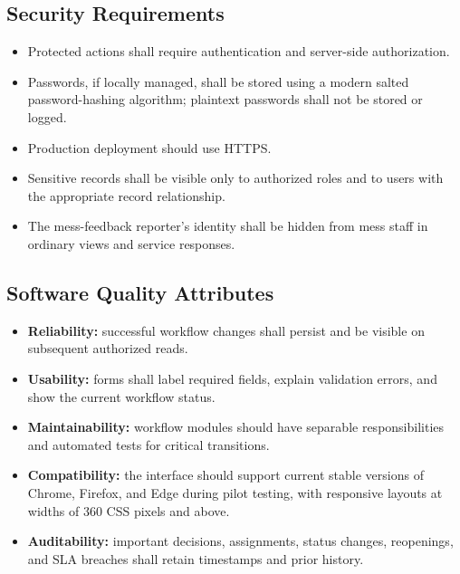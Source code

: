 \documentclass[11pt,a4paper]{article}
\numberwithin{figure}{section}   %
\begin{document}
\subsection{Security Requirements}
\begin{itemize}
\item Protected actions shall require authentication and server-side authorization.
\item Passwords, if locally managed, shall be stored using a modern salted password-hashing algorithm; plaintext passwords shall not be stored or logged.
\item Production deployment should use HTTPS.
\item Sensitive records shall be visible only to authorized roles and to users with the appropriate record relationship.
\item The mess-feedback reporter's identity shall be hidden from mess staff in ordinary views and service responses.
\end{itemize}

\subsection{Software Quality Attributes}
\begin{itemize}
\item \textbf{Reliability:} successful workflow changes shall persist and be visible on subsequent authorized reads.
\item \textbf{Usability:} forms shall label required fields, explain validation errors, and show the current workflow status.
\item \textbf{Maintainability:} workflow modules should have separable responsibilities and automated tests for critical transitions.
\item \textbf{Compatibility:} the interface should support current stable versions of Chrome, Firefox, and Edge during pilot testing, with responsive layouts at widths of 360 CSS pixels and above.
\item \textbf{Auditability:} important decisions, assignments, status changes, reopenings, and SLA breaches shall retain timestamps and prior history.
\end{itemize}
\end{document}
